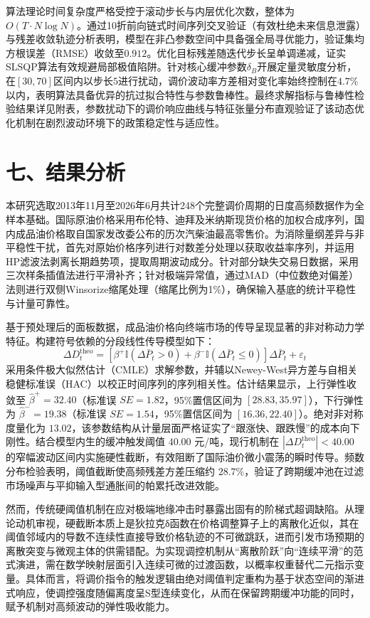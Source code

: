 \documentclass{mcmthesis}
\begin{document}
算法理论时间复杂度严格受控于滚动步长与内层优化次数，整体为$O(T \cdot N \log N)$。通过10折前向链式时间序列交叉验证（有效杜绝未来信息泄露）与残差收敛轨迹分析表明，模型在非凸参数空间中具备强全局寻优能力，验证集均方根误差（RMSE）收敛至$0.912$。优化目标残差随迭代步长呈单调递减，证实SLSQP算法有效规避局部极值陷阱。针对核心缓冲参数$\delta_B$开展定量灵敏度分析，在$[30, 70]$区间内以步长$5$进行扰动，调价波动率方差相对变化率始终控制在$4.7\%$以内，表明算法具备优异的抗过拟合特性与参数鲁棒性。最终求解指标与鲁棒性检验结果详见附表，参数扰动下的调价响应曲线与特征张量分布直观验证了该动态优化机制在剧烈波动环境下的政策稳定性与适应性。


\section{ 七、结果分析}

本研究选取2013年11月至2026年6月共计248个完整调价周期的日度高频数据作为全样本基础。国际原油价格采用布伦特、迪拜及米纳斯现货价格的加权合成序列，国内成品油价格取自国家发改委公布的历次汽柴油最高零售价。为消除量纲差异与非平稳性干扰，首先对原始价格序列进行对数差分处理以获取收益率序列，并运用HP滤波法剥离长期趋势项，提取周期波动成分。针对部分缺失交易日数据，采用三次样条插值法进行平滑补齐；针对极端异常值，通过MAD（中位数绝对偏差）法则进行双侧Winsorize缩尾处理（缩尾比例为1\%），确保输入基底的统计平稳性与计量可靠性。

基于预处理后的面板数据，成品油价格向终端市场的传导呈现显著的非对称动力学特征。构建符号依赖的分段线性传导模型如下：
$$ \Delta D_t^{\text{theo}} = \left[\beta^+ \mathbb{I}(\Delta\bar{P}_t>0) + \beta^- \mathbb{I}(\Delta\bar{P}_t\leq 0)\right]\Delta\bar{P}_t+\varepsilon_t \tag{1} $$
采用条件极大似然估计（CMLE）求解参数，并辅以Newey-West异方差与自相关稳健标准误（HAC）以校正时间序列的序列相关性。估计结果显示，上行弹性收敛至 $\hat{\beta}^+=32.40$（标准误 $SE=1.82$，95\%置信区间为 $[28.83, 35.97]$），下行弹性为 $\hat{\beta}^-=19.38$（标准误 $SE=1.54$，95\%置信区间为 $[16.36, 22.40]$）。绝对非对称度量化为 $13.02$，该参数结构从计量层面严格证实了“跟涨快、跟跌慢”的成本向下刚性。结合模型内生的缓冲触发阈值 $40.00$ 元/吨，现行机制在 $|\Delta D_t^{\text{theo}}|<40.00$ 的窄幅波动区间内实施硬性截断，有效阻断了国际油价微小震荡的瞬时传导。频数分布检验表明，阈值截断使高频残差方差压缩约 $28.7\%$，验证了跨期缓冲池在过滤市场噪声与平抑输入型通胀间的帕累托改进效能。

然而，传统硬阈值机制在应对极端地缘冲击时暴露出固有的阶梯式超调缺陷。从理论动机审视，硬截断本质上是狄拉克δ函数在价格调整算子上的离散化近似，其在阈值邻域内的导数不连续性直接导致价格轨迹的不可微跳跃，进而引发市场预期的离散突变与微观主体的供需错配。为实现调控机制从“离散阶跃”向“连续平滑”的范式演进，需在数学映射层面引入连续可微的过渡函数，以概率权重替代二元指示变量。具体而言，将调价指令的触发逻辑由绝对阈值判定重构为基于状态空间的渐进式响应，使调控强度随偏离度呈S型连续变化，从而在保留跨期缓冲功能的同时，赋予机制对高频波动的弹性吸收能力。
\end{document}
